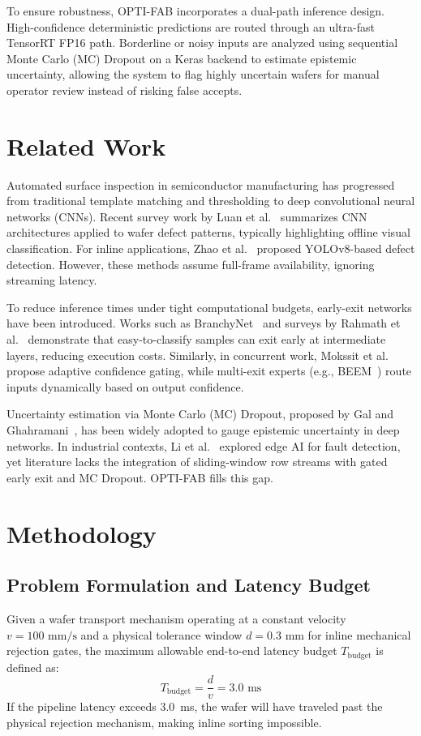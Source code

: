 \documentclass[conference]{IEEEtran}
\begin{document}
To ensure robustness, OPTI-FAB incorporates a dual-path inference design. High-confidence deterministic predictions are routed through an ultra-fast TensorRT FP16 path. Borderline or noisy inputs are analyzed using sequential Monte Carlo (MC) Dropout on a Keras backend to estimate epistemic uncertainty, allowing the system to flag highly uncertain wafers for manual operator review instead of risking false accepts.

\section{Related Work}
Automated surface inspection in semiconductor manufacturing has progressed from traditional template matching and thresholding to deep convolutional neural networks (CNNs). Recent survey work by Luan et al.~\cite{luan2020wafer} summarizes CNN architectures applied to wafer defect patterns, typically highlighting offline visual classification. For inline applications, Zhao et al.~\cite{zhao2023yolov8} proposed YOLOv8-based defect detection. However, these methods assume full-frame availability, ignoring streaming latency.

To reduce inference times under tight computational budgets, early-exit networks have been introduced. Works such as BranchyNet~\cite{teerapittayanon2016branchynet} and surveys by Rahmath et al.~\cite{rahmath2024early} demonstrate that easy-to-classify samples can exit early at intermediate layers, reducing execution costs. Similarly, in concurrent work, Mokssit et al.~\cite{mokssit2025confidence} propose adaptive confidence gating, while multi-exit experts (e.g., BEEM~\cite{bajpai2025beem}) route inputs dynamically based on output confidence. 

Uncertainty estimation via Monte Carlo (MC) Dropout, proposed by Gal and Ghahramani~\cite{gal2016dropout}, has been widely adopted to gauge epistemic uncertainty in deep networks. In industrial contexts, Li et al.~\cite{li2024edge} explored edge AI for fault detection, yet literature lacks the integration of sliding-window row streams with gated early exit and MC Dropout. OPTI-FAB fills this gap.

\section{Methodology}

\subsection{Problem Formulation and Latency Budget}
Given a wafer transport mechanism operating at a constant velocity $v = 100\text{ mm/s}$ and a physical tolerance window $d = 0.3\text{ mm}$ for inline mechanical rejection gates, the maximum allowable end-to-end latency budget $T_{\text{budget}}$ is defined as:
\begin{equation}
T_{\text{budget}} = \frac{d}{v} = 3.0\text{ ms}
\end{equation}
If the pipeline latency exceeds 3.0~ms, the wafer will have traveled past the physical rejection mechanism, making inline sorting impossible.
\end{document}
